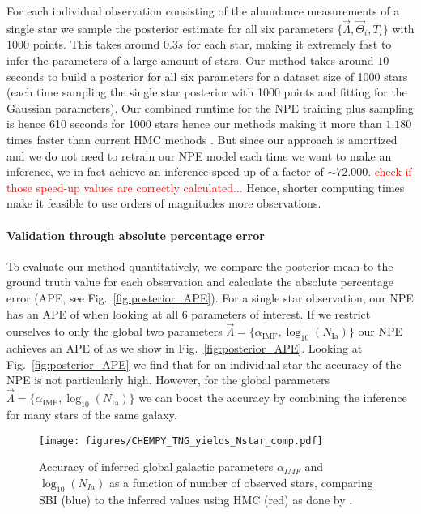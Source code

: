 \documentclass{aa}
\begin{document}
For each individual observation consisting of the abundance measurements of a single star we sample the posterior estimate for all six parameters $\{\vec\Lambda,\vec\Theta_i,T_i\}$ with 1000 points. This takes around $0.3s$ for each star, making it extremely fast to infer the parameters of a large amount of stars. Our method takes around $10$ seconds to build a posterior for all six parameters for a dataset size of 1000 stars (each time sampling the single star posterior with 1000 points and fitting for the Gaussian parameters). Our combined runtime for the NPE training plus sampling is hence 610 seconds for 1000 stars hence our methods making it more than $1.180$ times faster than current HMC methods \citep[cf.][who needs $40$h for only 200 stars]{Philcox_2019}. But since our approach is amortized and we do not need to retrain our NPE model each time we want to make an inference, we in fact achieve an inference speed-up of a factor of $\sim72.000$. \textcolor{red}{check if those speed-up values are correctly calculated...}
Hence, shorter computing times make it feasible to use orders of magnitudes more observations.

\paragraph{Validation through absolute percentage error}
To evaluate our method quantitatively, we compare the posterior mean to the ground truth value for each observation and calculate the absolute percentage error (APE, see Fig.~\ref{fig:posterior_APE}). For a single star observation, our NPE has an APE of  when looking at all 6 parameters of interest. If we restrict ourselves to only the global two parameters $\vec\Lambda = \{\alpha_\mathrm{IMF},\log_{10}(N_\mathrm{Ia})\}$ our NPE achieves an APE of  as we show in Fig.~\ref{fig:posterior_APE}. Looking at Fig.~\ref{fig:posterior_APE} we find that for an individual star the accuracy of the NPE is not particularly high. However, for the global parameters $\vec\Lambda = \{\alpha_\mathrm{IMF},\log_{10}(N_\mathrm{Ia})\}$ we can boost the accuracy by combining the inference for many stars of the same galaxy.

\begin{figure}
    \centering
    \texttt{[image: figures/CHEMPY\_TNG\_yields\_Nstar\_comp.pdf]}
    \vspace{-.25cm}
    \caption{Accuracy of inferred global galactic parameters $\alpha_{IMF}$ and $\log_{10}(N_{Ia})$ as a function of number of observed stars, comparing SBI (blue) to the inferred values using HMC (red) as done by \cite{Philcox_2019}.}
    \label{fig:CHEMPY_TNG_N_star_analysis}
\end{figure}
\end{document}
